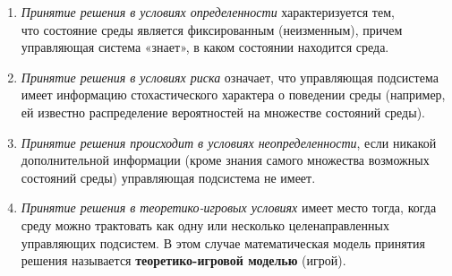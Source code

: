 \documentclass[17pt]{extarticle}
\begin{document}
\begin{enumerate}
      \item \textit{Принятие решения в условиях определенности} характеризуется тем, \\
            что состояние среды является фиксированным (неизменным), причем управляющая система «знает», в каком состоянии находится среда.

      \item \textit{Принятие решения в условиях риска} означает,
            что управляющая подсистема имеет информацию стохастического характера о поведении среды
            (например, ей известно распределение вероятностей на множестве состояний среды).

      \item \textit{Принятие решения происходит в условиях неопределенности},
            если никакой дополнительной информации (кроме знания самого множества возможных состояний среды) управляющая подсистема не имеет.

      \item \textit{Принятие решения в теоретико-игровых условиях} имеет место тогда,
            когда среду можно трактовать как одну или несколько целенаправленных управляющих подсистем.
            В этом случае математическая модель принятия решения называется \textbf{теоретико-игровой моделью} (игрой).
\end{enumerate}
\end{document}

